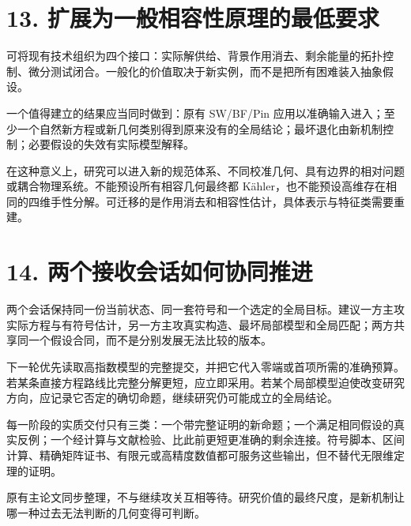 \documentclass[UTF8,a4paper,11pt,fontset=fandol]{ctexart}
\begin{document}
\section{13.
扩展为一般相容性原理的最低要求}\label{ux6269ux5c55ux4e3aux4e00ux822cux76f8ux5bb9ux6027ux539fux7406ux7684ux6700ux4f4eux8981ux6c42}

可将现有技术组织为四个接口：实际解供给、背景作用消去、剩余能量的拓扑控制、微分测试闭合。一般化的价值取决于新实例，而不是把所有困难装入抽象假设。

一个值得建立的结果应当同时做到：原有 SW/BF/Pin
应用以准确输入进入；至少一个自然新方程或新几何类别得到原来没有的全局结论；最坏退化由新机制控制；必要假设的失效有实际模型解释。

在这种意义上，研究可以进入新的规范体系、不同校准几何、具有边界的相对问题或耦合物理系统。不能预设所有相容几何最终都
Kähler，也不能预设高维存在相同的四维手性分解。可迁移的是作用消去和相容性估计，具体表示与特征类需要重建。

\section{14.
两个接收会话如何协同推进}\label{ux4e24ux4e2aux63a5ux6536ux4f1aux8bddux5982ux4f55ux534fux540cux63a8ux8fdb}

两个会话保持同一份当前状态、同一套符号和一个选定的全局目标。建议一方主攻实际方程与有符号估计，另一方主攻真实构造、最坏局部模型和全局匹配；两方共享同一个假设合同，而不是分别发展无法比较的版本。

下一轮优先读取高指数模型的完整提交，并把它代入零端或首项所需的准确预算。若某条直接方程路线比完整分解更短，应立即采用。若某个局部模型迫使改变研究方向，应记录它否定的确切命题，继续研究仍可能成立的全局结论。

每一阶段的实质交付只有三类：一个带完整证明的新命题；一个满足相同假设的真实反例；一个经计算与文献检验、比此前更短更准确的剩余连接。符号脚本、区间计算、精确矩阵证书、有限元或高精度数值都可服务这些输出，但不替代无限维定理的证明。

原有主论文同步整理，不与继续攻关互相等待。研究价值的最终尺度，是新机制让哪一种过去无法判断的几何变得可判断。
\end{document}
